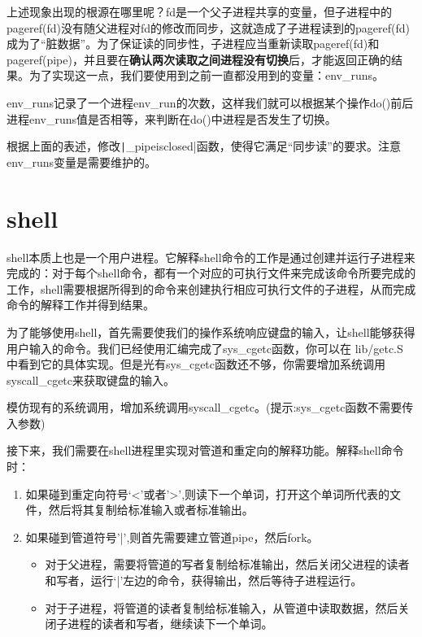 上述现象出现的根源在哪里呢？fd是一个父子进程共享的变量，但子进程中的pageref(fd)没有随父进程对fd的修改而同步，这就造成了子进程读到的pageref(fd)成为了“脏数据”。为了保证读的同步性，子进程应当重新读取pageref(fd)和pageref(pipe)，并且要在\textbf{确认两次读取之间进程没有切换}后，才能返回正确的结果。为了实现这一点，我们要使用到之前一直都没用到的变量：env\_runs。

env\_runs记录了一个进程env\_run的次数，这样我们就可以根据某个操作do()前后进程env\_runs值是否相等，来判断在do()中进程是否发生了切换。

\begin{exercise}
	根据上面的表述，修改\texttt|_pipeisclosed|函数，使得它满足“同步读”的要求。注意env\_runs变量是需要维护的。
\end{exercise}

\section{shell}

shell本质上也是一个用户进程。它解释shell命令的工作是通过创建并运行子进程来完成的：对于每个shell命令，都有一个对应的可执行文件来完成该命令所要完成的工作，shell需要根据所得到的命令来创建执行相应可执行文件的子进程，从而完成命令的解释工作并得到结果。

为了能够使用shell，首先需要使我们的操作系统响应键盘的输入，让shell能够获得用户输入的命令。我们已经使用汇编完成了sys\_cgetc函数，你可以在 lib/getc.S 中看到它的具体实现。但是光有sys\_cgetc函数还不够，你需要增加系统调用syscall\_cgetc来获取键盘的输入。

\begin{exercise}
	模仿现有的系统调用，增加系统调用syscall\_cgetc。(提示:sys\_cgetc函数不需要传入参数)
\end{exercise}

接下来，我们需要在shell进程里实现对管道和重定向的解释功能。解释shell命令时：

\begin{enumerate}
	\item 如果碰到重定向符号‘<’或者’>’,则读下一个单词，打开这个单词所代表的文件，然后将其复制给标准输入或者标准输出。
	\item 如果碰到管道符号’|’,则首先需要建立管道pipe，然后fork。
	\begin{itemize}
		\item 对于父进程，需要将管道的写者复制给标准输出，然后关闭父进程的读者和写者，运行‘|’左边的命令，获得输出，然后等待子进程运行。
		\item 对于子进程，将管道的读者复制给标准输入，从管道中读取数据，然后关闭子进程的读者和写者，继续读下一个单词。
	\end{itemize}
\end{enumerate}

